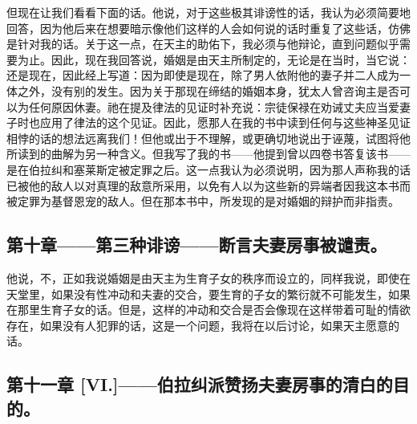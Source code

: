 但现在让我们看看下面的话。他说，对于这些极其诽谤性的话，我认为必须简要地回答，因为他后来在想要暗示像他们这样的人会如何说的话时重复了这些话，仿佛是针对我的话。关于这一点，在天主的助佑下，我必须与他辩论，直到问题似乎需要为止。因此，现在我回答说，婚姻是由天主所制定的，无论是在当时，当它说：还是现在，因此经上写道：因为即使是现在，除了男人依附他的妻子并二人成为一体之外，没有别的发生。因为关于那现在缔结的婚姻本身，犹太人曾咨询主是否可以为任何原因休妻。祂在提及律法的见证时补充说：宗徒保禄在劝诫丈夫应当爱妻子时也应用了律法的这个见证。因此，愿那人在我的书中读到任何与这些神圣见证相悖的话的想法远离我们！但他或出于不理解，或更确切地说出于诬蔑，试图将他所读到的曲解为另一种含义。但我写了我的书——他提到曾以四卷书答复该书——是在伯拉纠和塞莱斯定被定罪之后。这一点我认为必须说明，因为那人声称我的话已被他的敌人以对真理的敌意所采用，以免有人以为这些新的异端者因我这本书而被定罪为基督恩宠的敌人。但在那本书中，所发现的是对婚姻的辩护而非指责。\par


\subsection{第十章——第三种诽谤——断言夫妻房事被谴责。}

他说，不，正如我说婚姻是由天主为生育子女的秩序而设立的，同样我说，即使在天堂里，如果没有性冲动和夫妻的交合，要生育的子女的繁衍就不可能发生，如果在那里生育子女的话。但是，这样的冲动和交合是否会像现在这样带着可耻的情欲存在，如果没有人犯罪的话，这是一个问题，我将在以后讨论，如果天主愿意的话。\par


\subsection{第十一章 [VI.]——伯拉纠派赞扬夫妻房事的清白的目的。}

